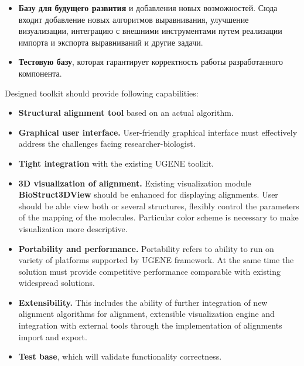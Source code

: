 \documentclass[a4paper, 12pt, titlepage, utf8]{extarticle}
\newcommand{\class}{\textbf}
\newcommand{\module}{\class}
\begin{document}
\begin{original}
\begin{original}
\begin{original}
\begin{itemize}
    \item \textbf{Базу для будущего развития} и добавления новых возможностей.
Сюда входит добавление новых алгоритмов выравнивания, улучшение визуализации,
интеграцию с внешними инструментами путем реализации импорта и экспорта
выравниваний и другие задачи.

    \item \textbf{Тестовую базу}, которая гарантирует корректность работы
разработанного компонента.
\end{itemize}
\end{original}

Designed toolkit should provide following capabilities:
\begin{itemize}
    \item \textbf{Structural alignment tool} based on an actual algorithm.

    \item \textbf{Graphical user interface.} User-friendly graphical interface
        must effectively address the challenges facing researcher-biologist.

    \item \textbf{Tight integration} with the existing UGENE toolkit.

    \item \textbf{3D visualization of alignment.}
        Existing visualization module \module{BioStruct3DView} should be enhanced
        for displaying alignments. User should be able view both or several structures,
        flexibly control the parameters of the mapping of the molecules. Particular
        color scheme is necessary to make visualization more descriptive.

    \item \textbf{Portability and performance.} Portability refers to ability to
        run on variety of platforms supported by UGENE framework. At the same time the
        solution must provide competitive performance comparable with existing
        widespread solutions.

    \item \textbf{Extensibility.} This includes the ability of further integration of
        new alignment algorithms for alignment, extensible visualization engine and
        integration with external tools through the implementation of alignments import
        and export.

    \item \textbf{Test base}, which will validate functionality correctness.
\end{itemize}


\end{original}
\end{original}
\end{document}
